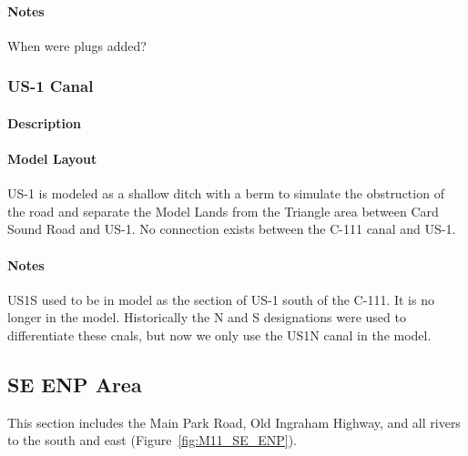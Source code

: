 \begin{notes}
\paragraph{Notes}
When were plugs added?
\end{notes}

\clearpage
\subsubsection{US-1 Canal}
\paragraph{Description}

\paragraph{Model Layout}
US-1 is modeled as a shallow ditch with a berm to simulate the obstruction of the road and separate the Model Lands from the Triangle area between Card Sound Road and US-1.
No connection exists between the C-111 canal and US-1.


\begin{notes}
\paragraph{Notes}
US1S used to be in model as the section of US-1 south of the C-111. It is no longer in the model. Historically the N and S designations were used to differentiate these cnals, but now we only use the US1N canal in the model.
\end{notes}


\clearpage






\subsection{SE ENP Area}
This section includes the Main Park Road, Old Ingraham Highway, and all rivers to the south and east (Figure~\ref{fig:M11_SE_ENP}).

